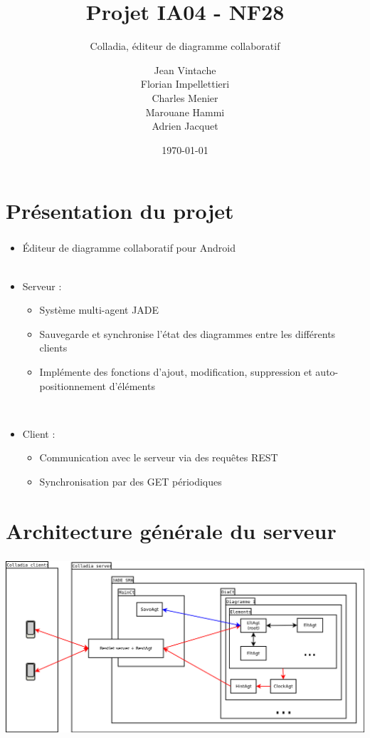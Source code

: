 \documentclass[11pt]{beamer}
\title{Projet IA04 - NF28}
\subtitle{Colladia, éditeur de diagramme collaboratif}
\author{Jean Vintache\\Florian Impellettieri\\Charles Menier\\Marouane Hammi\\Adrien Jacquet}
\date{\today}
\begin{document}
\small

\begin{frame}
	\vspace{-0.75cm}
	\titlepage
\end{frame}


\section{Présentation du projet}
\begin{frame}
	\frametitle{\currentname}
	\begin{itemize}
		\item Éditeur de diagramme collaboratif pour Android
		\\~\\
		\item Serveur :
		\begin{itemize}
			\item Système multi-agent JADE
			\item Sauvegarde et synchronise l'état des diagrammes entre les différents clients
			\item Implémente des fonctions d'ajout, modification, suppression et auto-positionnement d'éléments
		\end{itemize}
		~\\
		\item Client :
		\begin{itemize}
			\item Communication avec le serveur via des requêtes REST
			\item Synchronisation par des GET périodiques
		\end{itemize}
	\end{itemize}
\end{frame}

\section{Architecture générale du serveur}
\begin{frame}
	\frametitle{\currentname}
	\begin{center}
		\includegraphics[width=\textwidth]{img/general_server}
	\end{center}
\end{frame}
\end{document}
